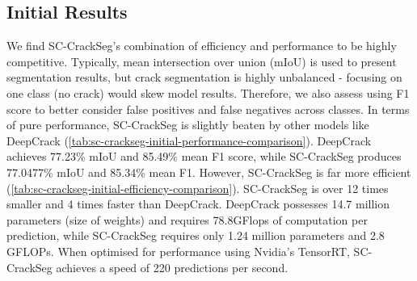\documentclass[a4paper,12pt]{report}
\begin{document}
\subsection{Initial Results}
We find SC-CrackSeg's combination of efficiency and performance to be highly competitive. Typically, mean intersection over union (mIoU) is used to present segmentation results, but crack segmentation is highly unbalanced - focusing on one class (no crack) would skew model results. Therefore, we also assess using F1 score to better consider false positives and false negatives across classes. In terms of pure performance, SC-CrackSeg is slightly beaten by other models like DeepCrack (\autoref{tab:sc-crackseg-initial-performance-comparison}). DeepCrack achieves 77.23\% mIoU and 85.49\% mean F1 score, while SC-CrackSeg produces 77.0477\% mIoU and 85.34\% mean F1. However, SC-CrackSeg is far more efficient (\autoref{tab:sc-crackseg-initial-efficiency-comparison}). SC-CrackSeg is over 12 times smaller and 4 times faster than DeepCrack. DeepCrack possesses 14.7 million parameters (size of weights) and requires 78.8GFlops of computation per prediction, while SC-CrackSeg requires only 1.24 million parameters and 2.8 GFLOPs. When optimised for performance using Nvidia's TensorRT, SC-CrackSeg achieves a speed of 220 predictions per second.
\end{document}
